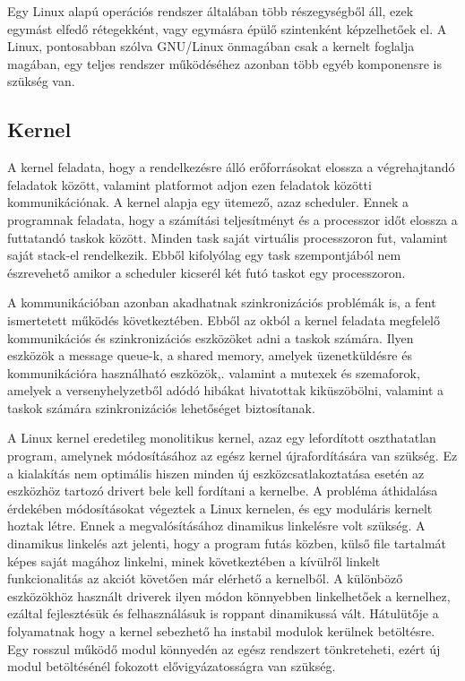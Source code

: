 Egy Linux alapú operációs rendszer általában több részegységből áll, ezek egymást elfedő rétegekként, vagy egymásra épülő szintenként képzelhetőek el. A Linux, pontosabban szólva GNU/Linux önmagában csak a kernelt foglalja magában,
egy teljes rendszer működéséhez azonban több egyéb komponensre is szükség van.

\subsection{Kernel}

A kernel feladata, hogy a rendelkezésre álló erőforrásokat elossza a végrehajtandó feladatok között, valamint platformot adjon ezen feladatok közötti kommunikációnak. A kernel alapja egy ütemező, azaz scheduler. Ennek a
programnak feladata, hogy a számítási teljesítményt és a processzor időt elossza a futtatandó taskok között. Minden task saját virtuális processzoron fut, valamint saját stack-el rendelkezik. Ebből kifolyólag egy task szempontjából
nem észrevehető amikor a scheduler kicserél két futó taskot egy processzoron.

A kommunikációban azonban akadhatnak szinkronizációs problémák is, a fent ismertetett működés következtében. Ebből az okból a kernel feladata megfelelő kommunikációs és szinkronizációs eszközöket adni a taskok számára. Ilyen
eszközök a message queue-k, a shared memory, amelyek üzenetküldésre és kommunikációra használható eszközök,. valamint a mutexek és szemaforok, amelyek a versenyhelyzetből adódó hibákat hivatottak kiküszöbölni, valamint  a taskok
számára szinkronizációs lehetőséget biztosítanak.

A Linux kernel eredetileg monolitikus kernel, azaz egy lefordított oszthatatlan program, amelynek módosításához az egész kernel újrafordítására van szükség. Ez a kialakítás nem optimális hiszen minden új eszközcsatlakoztatása esetén
az eszközhöz tartozó drivert bele kell fordítani a kernelbe. A probléma áthidalása érdekében módosításokat végeztek a Linux kernelen, és egy moduláris kernelt hoztak létre. Ennek a megvalósításához dinamikus linkelésre volt szükség.
A dinamikus linkelés azt jelenti, hogy a program futás közben, külső file tartalmát képes saját magához linkelni, minek következtében a kívülről linkelt funkcionalitás az akciót követően már elérhető a kernelből. A különböző
eszközökhöz használt driverek ilyen módon könnyebben linkelhetőek a kernelhez, ezáltal fejlesztésük és felhasználásuk is roppant dinamikussá vált. Hátulütője a folyamatnak hogy a kernel sebezhető ha instabil modulok kerülnek
betöltésre. Egy rosszul működő modul könnyedén az egész rendszert tönkreteheti, ezért új modul betöltésénél fokozott elővigyázatosságra van szükség.

